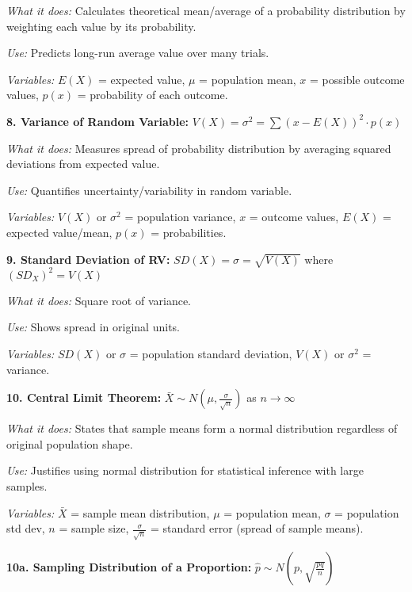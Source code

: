 \documentclass[10pt]{extarticle}
\begin{document}
\begin{multicol}{2}
\textit{What it does:} Calculates theoretical mean/average of a probability distribution by weighting each value by its probability. 

\textit{Use:} Predicts long-run average value over many trials. 

\textit{Variables:} $E(X)$ = expected value, $\mu$ = population mean, $x$ = possible outcome values, $p(x)$ = probability of each outcome.

\vspace{3pt}

\textbf{8. Variance of Random Variable:} $V(X) = \sigma^2 = \sum (x - E(X))^2 \cdot p(x)$

\textit{What it does:} Measures spread of probability distribution by averaging squared deviations from expected value. 

\textit{Use:} Quantifies uncertainty/variability in random variable. 

\textit{Variables:} $V(X)$ or $\sigma^2$ = population variance, $x$ = outcome values, $E(X)$ = expected value/mean, $p(x)$ = probabilities.

\vspace{3pt}

\textbf{9. Standard Deviation of RV:} $SD(X) = \sigma = \sqrt{V(X)}$ where $(SD_X)^2 = V(X)$

\textit{What it does:} Square root of variance. 

\textit{Use:} Shows spread in original units. 

\textit{Variables:} $SD(X)$ or $\sigma$ = population standard deviation, $V(X)$ or $\sigma^2$ = variance.

\vspace{3pt}

\textbf{10. Central Limit Theorem:} $\bar{X} \sim N(\mu, \frac{\sigma}{\sqrt{n}})$ as $n \to \infty$

\textit{What it does:} States that sample means form a normal distribution regardless of original population shape. 

\textit{Use:} Justifies using normal distribution for statistical inference with large samples. 

\textit{Variables:} $\bar{X}$ = sample mean distribution, $\mu$ = population mean, $\sigma$ = population std dev, $n$ = sample size, $\frac{\sigma}{\sqrt{n}}$ = standard error (spread of sample means).

\vspace{3pt}

\textbf{10a. Sampling Distribution of a Proportion:} $\hat{p} \sim N\left(p, \sqrt{\frac{pq}{n}}\right)$


\end{multicol}
\end{document}
